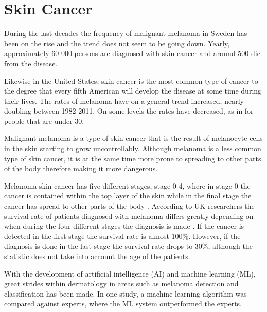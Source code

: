 \documentclass{kththesis}
\begin{document}
\section{Skin Cancer}



During the last decades the frequency of malignant melanoma in Sweden has been on the rise and the trend does not seem to be going down. Yearly, approximately 60 000 persons are diagnosed with skin cancer and around 500 die from the disease. \parencite{sverige-hudcancer}

Likewise in the United States, skin cancer is the most common type of cancer to the degree that every fifth American will develop the disease at some time during their lives. The rates of melanoma have on a general trend increased, nearly doubling between 1982-2011. On some levels the rates have decreased, as in for people that are under 30. \parencite{aad-skin-cancer}

Malignant melanoma is a type of skin cancer that is the result of melano\-cyte cells in the skin starting to grow uncontrollably.
Although melanoma is a less common type of skin cancer, it is at the same time more prone to spreading to other parts of the body therefore making it more dangerous. \parencite{aad-skin-cancer}

Melanoma skin cancer has five different stages, stage 0-4, where in stage 0 the cancer is contained within the top layer of the skin while in the final stage the cancer has spread to other parts of the body \parencite{cancerresearchuk-melanoma}.
According to UK researchers the survival rate of patients diagnosed with melanoma differs greatly depending on when during the four different stages the diagnosis is made \parencite{cancerresearchuk-survival}.
If the cancer is detected in the first stage the survival rate is almost 100\%. However, if the diagnosis is done in the last stage the survival rate drops to 30\%, although the statistic does not take into account the age of the patients. \parencite{cancerresearchuk-survival}

With the development of artificial intelligence (AI) and machine learning (ML), great strides within dermatology in areas such as melanoma detection and classification has been made. In one study, a machine learning algorithm was compared against experts, where the ML system outperformed the experts. \parencite{8030303}
\end{document}
